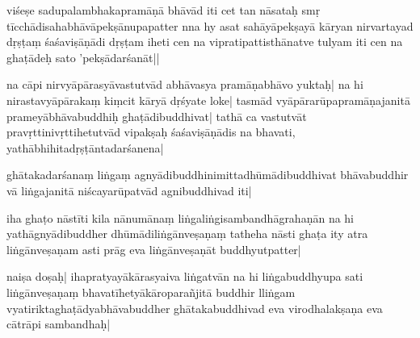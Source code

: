 viśeṣ\mme e sadupalambhakapramāṇā%
bhāvād iti cet tan nāsataḥ smṛ%
tīcchādisahabhāvāpekṣānupapatter nna hy asat sahāyāpekṣayā kārya\mms n nirvartayad dṛṣṭaṃ śaśaviṣāṇā\mme di dṛṣṭam iheti cen na vipratipattisthānatve
tulyam iti cen na ghaṭādeḥ sato 'pekṣādarśanāt||

na cāpi nirvyāpārasyāvastutvād abhāvasya pramāṇabhāvo yuktaḥ| %
na hi nirastavyāpārakaṃ kiṃc\mms it kāryā\mme{} dṛśyate loke| %
tasmād vyāpārarūpapramāṇajanitā prameyābhāvabuddhiḥ
ghaṭādibuddhivat| tathā ca vastutvāt pravṛttinivṛttihetutvād vipakṣaḥ śaśaviṣāṇādis %
na bhavati, yathābhihitadṛṣṭāntadarśanena|

ghātakadarśanaṃ  liṅgaṃ
agnyādibuddhinimittadhūmādibuddhivat %
bhāvabuddhir vā liṅgajanitā niścayarūpatvād agnibuddhivad iti| %

iha ghaṭo nāstīti kila nānumānaṃ liṅgaliṅgisambandhāgrahaṇān na hi yathāgnyādibuddher dhūmādiliṅgānveṣaṇaṃ tatheha nāsti ghaṭa %
ity atra liṅgānveṣaṇam asti prāg eva liṅgānveṣaṇāt buddhyutpatter| %

naiṣa doṣaḥ| ihapratyayākārasyaiva liṅgatvān na hi
liṅgabuddhyupa
sati liṅgānveṣaṇaṃ bhavatīhetyākāroparañjitā buddhir lliṅgam
vyatiriktaghaṭādyabhāvabuddher ghātakabuddhivad eva virodhalakṣaṇa eva cātrāpi sambandhaḥ|

